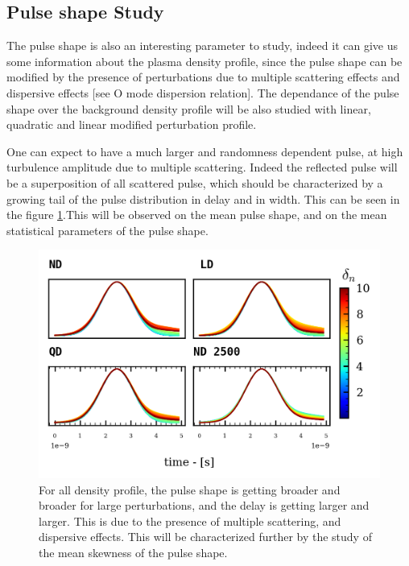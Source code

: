\documentclass[11pt,a4paper]{report}
\begin{document}
\begin{multicols*}{2}
    \subsection{Pulse shape Study}
    The pulse shape is also an interesting parameter to study, indeed it can give us some information about the plasma density profile, since the pulse shape can be modified by the presence of perturbations due to multiple scattering effects and dispersive effects [see O mode dispersion relation].
    The dependance of the pulse shape over the background density profile will be also studied with linear, quadratic and linear modified perturbation profile.


    One can expect to have a much larger and randomness dependent pulse, at high turbulence amplitude due to multiple scattering.
    Indeed the reflected pulse will be a superposition of all scattered pulse, which should be characterized by a growing tail of the pulse distribution in delay and in width. This can be seen in the figure \ref{fig:barrier}.This will be observed on the mean pulse shape, and on the mean statistical parameters of the pulse shape.
    \begin{figure}[H]
        \centering
        \includegraphics[width=1.1\linewidth]{./figures/pulse_shape.png}
        \caption{For all density profile, the pulse shape is getting broader and broader for large perturbations, and the delay is getting larger and larger. This is due to the presence of multiple scattering, and dispersive effects. This will be characterized further by the study of the mean skewness of the pulse shape.}
        \label{fig:barrier}
    \end{figure}
\end{multicols*}
\end{document}
